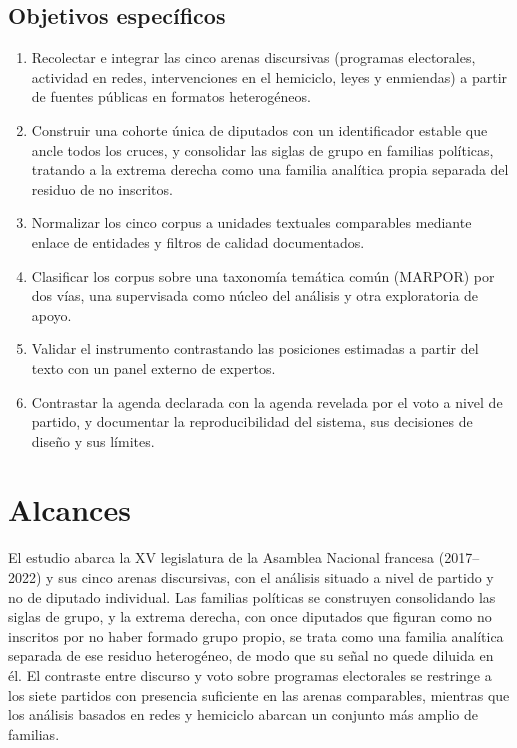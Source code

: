 \subsection{Objetivos específicos}
\label{sec:objetivos-especificos}

\begin{enumerate}
  \item Recolectar e integrar las cinco arenas discursivas (programas
  electorales, actividad en redes, intervenciones en el hemiciclo, leyes y
  enmiendas) a partir de fuentes públicas en formatos heterogéneos.
  \item Construir una cohorte única de diputados con un identificador estable que
  ancle todos los cruces, y consolidar las siglas de grupo en familias políticas,
  tratando a la extrema derecha como una familia analítica propia separada del
  residuo de no inscritos.
  \item Normalizar los cinco corpus a unidades textuales comparables mediante
  enlace de entidades y filtros de calidad documentados.
  \item Clasificar los corpus sobre una taxonomía temática común (MARPOR) por dos
  vías, una supervisada como núcleo del análisis y otra exploratoria de apoyo.
  \item Validar el instrumento contrastando las posiciones estimadas a partir del
  texto con un panel externo de expertos.
  \item Contrastar la agenda declarada con la agenda revelada por el voto a nivel
  de partido, y documentar la reproducibilidad del sistema, sus decisiones de
  diseño y sus límites.
\end{enumerate}

\section{Alcances}
\label{sec:alcances}

El estudio abarca la XV legislatura de la Asamblea Nacional francesa (2017--2022)
y sus cinco arenas discursivas, con el análisis situado a nivel de partido y no
de diputado individual. Las familias políticas se construyen consolidando las
siglas de grupo, y la extrema derecha, con once diputados que figuran como no
inscritos por no haber formado grupo propio, se trata como una familia analítica
separada de ese residuo heterogéneo, de modo que su señal no quede diluida en él.
El contraste entre discurso y voto sobre programas electorales se restringe a los
siete partidos con presencia suficiente en las arenas comparables, mientras que
los análisis basados en redes y hemiciclo abarcan un conjunto más amplio de
familias.

